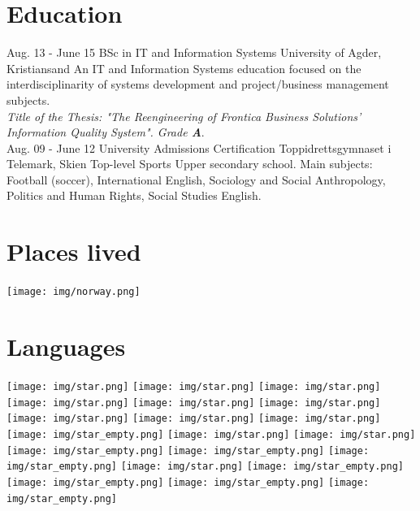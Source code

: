 \documentclass[]{cv-class}
\begin{document}
\section{Education}
\begin{entrylist}
  \entry
    {Aug. 13 - June 15}
    {BSc in IT and Information Systems}
    {University of Agder, Kristiansand}
    {An IT and Information Systems education focused on the interdisciplinarity of
    systems development and project/business management subjects.\\
    \emph{Title of the Thesis: "The Reengineering of Frontica Business Solutions'
    Information Quality System". Grade \textbf{A}}.\\}
  \entry
    {Aug. 09 - June 12}
    {University Admissions Certification}
    {Toppidrettsgymnaset i Telemark, Skien}
    {Top-level Sports Upper secondary school.
    Main subjects: Football (soccer), International English, Sociology and Social Anthropology,
    Politics and Human Rights, Social Studies English.}
\end{entrylist}



\newpage

\begin{aside}
  \vspace{1cm}
  \section{Places lived}
    \texttt{[image: img/norway.png]}
    ~
  \section{Languages}
    {\texttt{[image: img/star.png]}
    \texttt{[image: img/star.png]}
    \texttt{[image: img/star.png]}
    \texttt{[image: img/star.png]}
    \texttt{[image: img/star.png]}}
    {\texttt{[image: img/star.png]}
    \texttt{[image: img/star.png]}
    \texttt{[image: img/star.png]}
    \texttt{[image: img/star.png]}
    \texttt{[image: img/star\_empty.png]}}
    {\texttt{[image: img/star.png]}
    \texttt{[image: img/star.png]}
    \texttt{[image: img/star\_empty.png]}
    \texttt{[image: img/star\_empty.png]}
    \texttt{[image: img/star\_empty.png]}}
    {\texttt{[image: img/star.png]}
    \texttt{[image: img/star\_empty.png]}
    \texttt{[image: img/star\_empty.png]}
    \texttt{[image: img/star\_empty.png]}
    \texttt{[image: img/star\_empty.png]}}
    ~
\end{aside}
\end{document}
